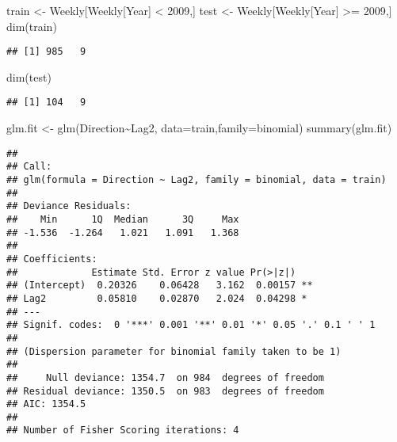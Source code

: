 \documentclass[
]{article}
\newenvironment{Shaded}{\begin{snugshade}}{\end{snugshade}}
\newcommand{\AttributeTok}[1]{\textcolor[rgb]{0.77,0.63,0.00}{#1}}
\newcommand{\DecValTok}[1]{\textcolor[rgb]{0.00,0.00,0.81}{#1}}
\newcommand{\FunctionTok}[1]{\textcolor[rgb]{0.00,0.00,0.00}{#1}}
\newcommand{\NormalTok}[1]{#1}
\newcommand{\OtherTok}[1]{\textcolor[rgb]{0.56,0.35,0.01}{#1}}
\newcommand{\SpecialCharTok}[1]{\textcolor[rgb]{0.00,0.00,0.00}{#1}}
\newcommand{\StringTok}[1]{\textcolor[rgb]{0.31,0.60,0.02}{#1}}
\begin{document}
\begin{Shaded}
\begin{Highlighting}[]
\NormalTok{train }\OtherTok{\textless{}{-}}\NormalTok{ Weekly[Weekly[}\StringTok{\textquotesingle{}Year\textquotesingle{}}\NormalTok{] }\SpecialCharTok{\textless{}} \DecValTok{2009}\NormalTok{,]}
\NormalTok{test }\OtherTok{\textless{}{-}}\NormalTok{ Weekly[Weekly[}\StringTok{\textquotesingle{}Year\textquotesingle{}}\NormalTok{] }\SpecialCharTok{\textgreater{}=} \DecValTok{2009}\NormalTok{,]}
\FunctionTok{dim}\NormalTok{(train)}
\end{Highlighting}
\end{Shaded}

\begin{verbatim}
## [1] 985   9
\end{verbatim}

\begin{Shaded}
\begin{Highlighting}[]
\FunctionTok{dim}\NormalTok{(test)}
\end{Highlighting}
\end{Shaded}

\begin{verbatim}
## [1] 104   9
\end{verbatim}

\begin{Shaded}
\begin{Highlighting}[]
\NormalTok{glm.fit }\OtherTok{\textless{}{-}} \FunctionTok{glm}\NormalTok{(Direction}\SpecialCharTok{\textasciitilde{}}\NormalTok{Lag2,}
               \AttributeTok{data=}\NormalTok{train,}\AttributeTok{family=}\NormalTok{binomial)}
\FunctionTok{summary}\NormalTok{(glm.fit)}
\end{Highlighting}
\end{Shaded}

\begin{verbatim}
## 
## Call:
## glm(formula = Direction ~ Lag2, family = binomial, data = train)
## 
## Deviance Residuals: 
##    Min      1Q  Median      3Q     Max  
## -1.536  -1.264   1.021   1.091   1.368  
## 
## Coefficients:
##             Estimate Std. Error z value Pr(>|z|)   
## (Intercept)  0.20326    0.06428   3.162  0.00157 **
## Lag2         0.05810    0.02870   2.024  0.04298 * 
## ---
## Signif. codes:  0 '***' 0.001 '**' 0.01 '*' 0.05 '.' 0.1 ' ' 1
## 
## (Dispersion parameter for binomial family taken to be 1)
## 
##     Null deviance: 1354.7  on 984  degrees of freedom
## Residual deviance: 1350.5  on 983  degrees of freedom
## AIC: 1354.5
## 
## Number of Fisher Scoring iterations: 4
\end{verbatim}
\end{document}
